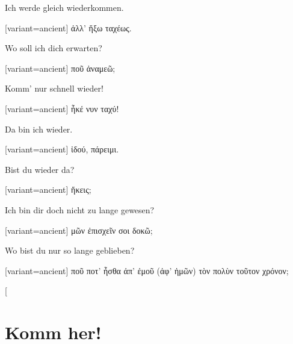 Ich werde gleich wiederkommen.

\switchcolumn

\begin{greek}[variant=ancient]%
ἀλλ' ἥξω ταχέως.

\end{greek}%
\switchcolumn*

Wo soll ich dich erwarten?

\switchcolumn

\begin{greek}[variant=ancient]%
ποῦ ἀναμεῶ;

\end{greek}%
\switchcolumn*

Komm' nur schnell wieder!

\switchcolumn

\begin{greek}[variant=ancient]%
ἧκέ νυν ταχύ!

\end{greek}%
\switchcolumn*

Da bin ich wieder.

\switchcolumn

\begin{greek}[variant=ancient]%
ἰδού, πάρειμι.

\end{greek}%
\switchcolumn*

Bist du wieder da?

\switchcolumn

\begin{greek}[variant=ancient]%
ἥκεις;

\end{greek}%
\switchcolumn*

Ich bin dir doch nicht zu lange gewesen?

\switchcolumn

\begin{greek}[variant=ancient]%
μῶν ἐπισχεῖν σοι δοκῶ;

\end{greek}%
\switchcolumn*

Wo bist du nur so lange geblieben?

\switchcolumn

\begin{greek}[variant=ancient]%
ποῦ ποτ' ἦσθα ἀπ' ἐμοῦ (ἀφ' ἡμῶν) τὸν πολὺν τοῦτον χρόνον;

\end{greek}%
\switchcolumn*[


\section{Komm her!}

